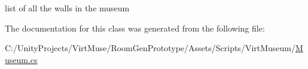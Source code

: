list of all the walls in the museum 



The documentation for this class was generated from the following file\+:\begin{DoxyCompactItemize}
\item 
C\+:/\+Unity\+Projects/\+Virt\+Muse/\+Room\+Gen\+Prototype/\+Assets/\+Scripts/\+Virt\+Museum/\mbox{\hyperlink{_museum_8cs}{Museum.\+cs}}\end{DoxyCompactItemize}
